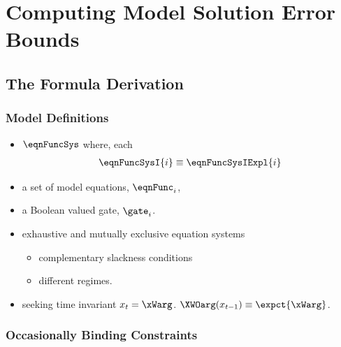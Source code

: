 \documentclass[notheorems]{beamer}
\begin{document}
\section{Computing Model Solution Error Bounds}
\label{sec:solnerrorbounds}

\subsection{The Formula Derivation}
\label{sec:errorformula}
\begin{frame}
  \frametitle{Model Definitions}
  
\begin{itemize}
\item $\eqnFuncSys$ where, each 
\begin{gather*}
\eqnFuncSysI{i}\equiv \eqnFuncSysIExpl{i} 
\end{gather*}
\item a set of model equations, $\eqnFunc_i$, 
\item  a Boolean valued gate, $\gate_i$. 
\item exhaustive and mutually exclusive equation systems 
  \begin{itemize}
  \item complementary slackness conditions 
\item different regimes. 
  \end{itemize}
\item seeking time invariant $x_t=\xWarg$.  $\XWOarg(x_{t-1})\equiv \expct{\xWarg}$.
\end{itemize}

\end{frame}



\subsubsection{Occasionally Binding Constraints}
\label{sec:obc-solut}
\end{document}
